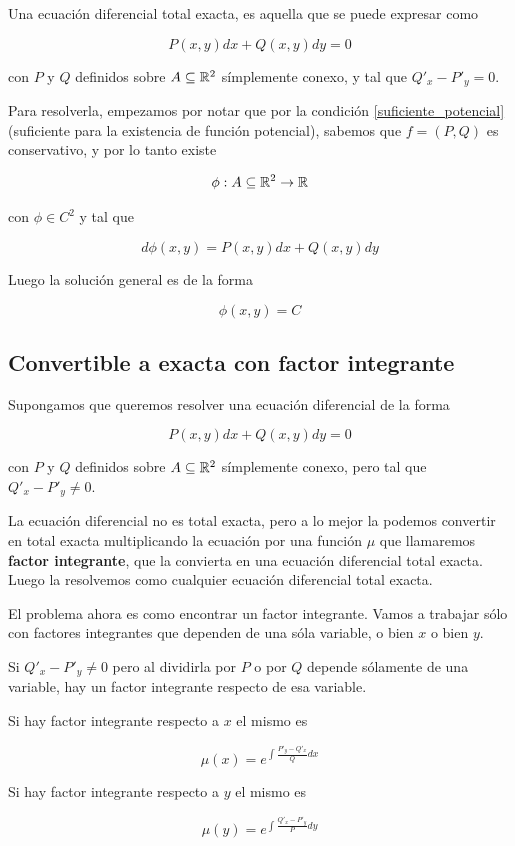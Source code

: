 \begin{definition} 
Una ecuación diferencial total exacta, es aquella que se puede expresar como

$$ P(x,y) dx + Q(x,y) dy = 0$$

con $P$ y $Q$ definidos sobre $A \subseteq \mathbb{R}^2$ símplemente conexo, y tal que $Q'_x - P'_y = 0$.
\end{definition}

Para resolverla, empezamos por notar que por la condición \ref{suficiente_potencial} (suficiente para la existencia de función potencial), sabemos que $f = (P,Q)$ es conservativo, y por lo tanto existe 

$$\phi : A \subseteq \mathbb{R}^2 \to \mathbb{R}$$

con $\phi \in C^2$ y tal que

$$ d\phi(x,y) = P(x,y)dx + Q(x,y)dy $$

Luego la solución general es de la forma

$$ \phi(x,y) = C$$

\subsection{Convertible a exacta con factor integrante}

Supongamos que queremos resolver una ecuación diferencial de la forma

$$ P(x,y) dx + Q(x,y) dy = 0$$

con $P$ y $Q$ definidos sobre $A \subseteq \mathbb{R}^2$ símplemente conexo, pero tal que $Q'_x - P'_y \neq 0$.

La ecuación diferencial no es total exacta, pero a lo mejor la podemos convertir en total exacta multiplicando la ecuación por una función $\mu$ que llamaremos \textbf{factor integrante}, que la convierta en una ecuación diferencial total exacta.  Luego la resolvemos como cualquier ecuación diferencial total exacta.

El problema ahora es como encontrar un factor integrante.  Vamos a trabajar sólo con factores integrantes que dependen de una sóla variable, o bien $x$ o bien $y$.

\begin{proposition} 
Si $ Q'_x - P'_y \neq 0$ pero al dividirla por $P$ o por $Q$ depende sólamente de una variable, hay un factor integrante respecto de esa variable.  

Si hay factor integrante respecto a $x$ el mismo es

$$ \mu(x) = e^{\int \frac{P'_y - Q'_x}{Q} dx} $$

Si hay factor integrante respecto a $y$ el mismo es

$$ \mu(y) = e^{\int \frac{Q'_x - P'_y}{P} dy} $$
\end{proposition}

